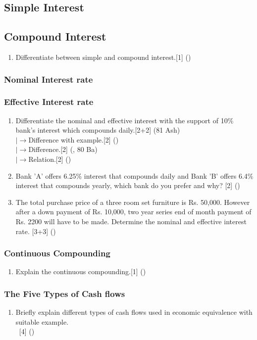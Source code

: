 \documentclass[12pt]{article}
\newcommand{\lb}{\\ $\left|\rightarrow\right.$}
\newcommand{\enter}{\\\textcolor{white}{1}}
\begin{document}
	\subsection{Simple Interest}
	\subsection{Compound Interest}
	\begin{enumerate}
	\item Differentiate between simple and compound interest.\hfill[1] ()
	\end{enumerate}
	\subsubsection{Nominal Interest rate}
	\subsubsection{Effective Interest rate}
	\begin{enumerate}
	\item Differentiate the nominal and effective interest with the support of 10\% bank's interest which compounds daily.\hfill[2+2] (81 Ash)
	\lb Difference with example.\hfill[2] ()
	\lb Difference.\hfill[2] (, 80 Ba)
	\lb Relation.\hfill[2] ()

	\item Bank 'A' offers 6.25\% interest that compounds daily and Bank 'B' offers 6.4\% interest that compounds yearly, which bank do you prefer and why?\hspace{6.2cm} [2] ()

	\item The total purchase price of a three room set furniture is Rs. 50,000. However after a down payment of Rs. 10,000, two year series end of month payment of Rs. 2200 will have to be made.  Determine the nominal and effective interest rate. \hfill [3+3] ()
	\end{enumerate}
	\subsubsection{Continuous Compounding}
	\begin{enumerate}
	\item Explain the continuous compounding.\hfill[1] ()
	\end{enumerate}
	\subsubsection{The Five Types of Cash flows}
	\begin{enumerate}
	\item Briefly explain different types of cash flows used in economic equivalence with suitable example.
	\enter\hfill[4] ()
	\end{enumerate}
\end{document}

